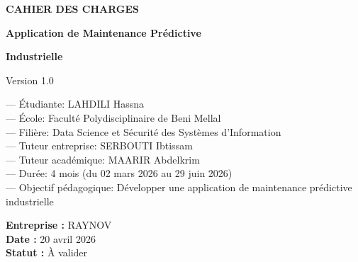 \documentclass[10pt,a4paper]{article}
\begin{document}
\begin{titlepage}
\thispagestyle{empty}
\centering
\vspace*{2.5cm}

{\Huge\bfseries CAHIER DES CHARGES\par}
\vspace{0.8cm}
{\LARGE\bfseries Application de Maintenance Prédictive\par}
{\LARGE\bfseries Industrielle\par}

\vspace{1.2cm}
{\large Version 1.0\par}

\vspace{1.4cm}
\begin{flushleft}
\hspace{2.4cm}--- Étudiante: LAHDILI Hassna\\[0.18cm]
\hspace{2.4cm}--- École: Faculté Polydisciplinaire de Beni Mellal\\[0.18cm]
\hspace{2.4cm}--- Filière: Data Science et Sécurité des Systèmes d'Information\\[0.18cm]
\hspace{2.4cm}--- Tuteur entreprise: SERBOUTI Ibtissam\\[0.18cm]
\hspace{2.4cm}--- Tuteur académique: MAARIR Abdelkrim\\[0.18cm]
\hspace{2.4cm}--- Durée: 4 mois (du 02 mars 2026 au 29 juin 2026)\\[0.18cm]
\hspace{2.4cm}--- Objectif pédagogique: Développer une application de maintenance prédictive industrielle
\end{flushleft}

\vfill
\begin{flushleft}
\hspace{2.4cm}\textbf{Entreprise :} RAYNOV\\[0.25cm]
\hspace{2.4cm}\textbf{Date :} 20 avril 2026\\[0.25cm]
\hspace{2.4cm}\textbf{Statut :} À valider
\end{flushleft}
\end{titlepage}
\end{document}
